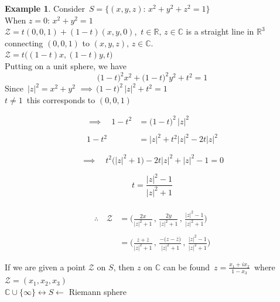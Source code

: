 \documentclass[11pt,a4paper]{article}
\theoremstyle{definition}
\newtheorem{example}[thm]{Example}
\begin{document}
\begin{example}
Consider $\, S = \big\{ (x,y,z):\, x^2 + y^2 +z^2 = 1\big\}$\\

When $z = 0:\, x^2 + y^2 = 1$\\

$\mathcal{Z} = t(0,0,1) + (1-t)(x,y,0)$, $\, t \in \mathbb{R}, \, z \in \mathbb{C}$ is a straight line in $\mathbb{R}^3$ connecting $(0,0,1)$ to $(x,y,z), \, z \in \mathbb{C}$.\\

$\mathcal{Z} = t\big((1-t)x, (1-t)y, t\big)$\\

Putting on a unit sphere, we have
$$\big(1 - t\big)^2 x^2 + \big(1 - t\big)^2 y^2 + t^2 = 1$$
Since $\, \left|z\right|^2 = x^2 + y^2$
$\implies\, \big(1 -t\big)^2\,\left|z\right|^2 + t^2 = 1$\\

$t\neq 1\,$ this corresponds to $(0,0,1)$

\begin{align*}
\implies\quad  1 - t^2 & = \big(1- t\big)^2\,\left|z\right|^2\\\\
1 - t^2 & = \left|z\right|^2 + t^2 \left|z\right|^2 - 2t\left|z\right|^2
\end{align*}


$$\implies \quad  t^2\big(\left|z\right|^2 + 1\big) - 2 t \left|z\right|^2 + \left|z\right|^2 - 1= 0$$



$$ t = \frac{\left|z\right|^2 - 1}{\left|z\right|^2 + 1}$$\\



\begin{align*}
\therefore\quad  \mathcal{Z} & = \Bigg( \frac{2x}{\left|z\right|^2 + 1}\,,\, \frac{2y}{\left|z\right|^2 + 1}\,,\,  \frac{\left|z\right|^2 - 1}{\left|z\right|^2 + 1}\Bigg)\\\\
& = \Bigg( \frac{z + \overline{z}}{\left|z\right|^2 + 1}\,,\, \frac{-\big(z - \overline{z}\big)}{\left|z\right|^2 + 1}\,,\,  \frac{\left|z\right|^2 - 1}{\left|z\right|^2 + 1}\Bigg)
\end{align*}

If we are given a point $\mathcal{Z}$ on $S$, then $z$ on $\mathbb{C}$ can be found $\, z = \frac{x_1 + ix_2}{1 - x_3}\,$ where $\mathcal{Z} = (x_1, x_2, x_3)$\\

$\mathbb{C}\cup \{\infty\} \longleftrightarrow S\longleftarrow$ Riemann sphere\\


\end{example}
\end{document}
